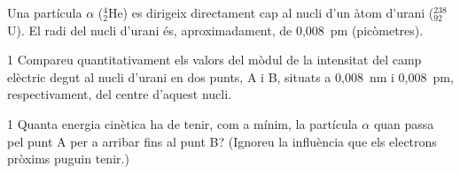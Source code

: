 Una partícula $\alpha$ ($^{4}_{2}$He) es dirigeix directament cap al nucli d'un àtom d'urani ($^{238}_{92}$U). El radi del nucli d'urani és, aproximadament, de 0,008~pm (picòmetres).


\begin{apartat}{1}
Compareu quantitativament els valors del mòdul de la intensitat del camp elèctric degut al nucli d'urani en dos punts, A i B, situats a 0,008~nm i 0,008~pm, respectivament, del centre d'aquest nucli.
\end{apartat}

\begin{apartat}{1}
Quanta energia cinètica ha de tenir, com a mínim, la partícula $\alpha$ quan passa pel punt A per a arribar fins al punt B? (Ignoreu la influència que els electrons pròxims puguin tenir.)
\end{apartat}

